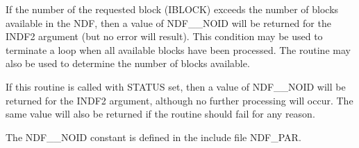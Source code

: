 \documentclass[twoside,11pt,nolof]{starlink}
\begin{document}
{{{         \sstitem
         If the number of the requested block (IBLOCK) exceeds the
         number of blocks available in the NDF, then a value of NDF\_\_NOID
         will be returned for the INDF2 argument (but no error will
         result). This condition may be used to terminate a loop when all
         available blocks have been processed. The  routine may
         also be used to determine the number of blocks available.

         \sstitem
         If this routine is called with STATUS set, then a value of
         NDF\_\_NOID will be returned for the INDF2 argument, although no
         further processing will occur. The same value will also be
         returned if the routine should fail for any reason.

         \sstitem
         The NDF\_\_NOID constant is defined in the include file NDF\_PAR.
      }
   }
}
\end{document}
